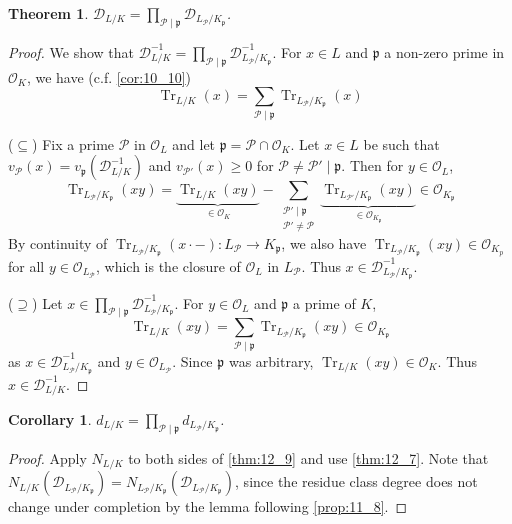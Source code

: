 \documentclass[11pt]{article}
\theoremstyle{definition}
\theoremstyle{plain}
\newtheorem{theorem}[definition]{Theorem}
\newtheorem{corollary}[definition]{Corollary}
\theoremstyle{remark}
\DeclareMathOperator{\Tr}{Tr}
\newcommand{\cD}{\mathcal{D}}
\newcommand{\cO}{\mathcal{O}}
\newcommand{\cP}{\mathcal{P}}
\newcommand{\fp}{\mathfrak{p}}
\begin{document}
\begin{theorem}\label{thm:12_9}
    $\cD_{L/K} = \prod_{\cP \mid \fp} \cD_{L_\cP / K_\fp}$.
\end{theorem}
\begin{proof}
    We show that $\cD_{L/K}^{-1} = \prod_{\cP \mid \fp} \cD_{L_\cP / K_\fp}^{-1}$. For $x \in L$ and $\fp$ a non-zero prime in $\cO_K$, we have (c.f. \autoref{cor:10_10})
    \begin{equation}\label{eq:3}
        \Tr_{L/K}(x) = \sum_{\cP \mid \fp} \Tr_{L_\cP / K_\fp}(x)
    \end{equation}

    \noindent ($\subseteq$) Fix a prime $\cP$ in $\cO_L$ and let $\fp = \cP \cap \cO_K$. Let $x \in L$ be such that $v_\cP(x) = v_\fp(\cD_{L/K}^{-1})$ and $v_{\cP'}(x) \ge 0$ for $\cP \neq \cP' \mid \fp$. Then for $y \in \cO_L$,
    \begin{equation*}
        \Tr_{L_\cP/K_\fp}(xy) = \underbrace{\Tr_{L/K}(xy)}_{\in \cO_K} - \sum_{\substack{\cP' \mid \fp \\ \cP' \neq \cP}} \underbrace{\Tr_{L_{\cP'}/K_\fp}(xy)}_{\in \cO_{K_\fp}} \in \cO_{K_\fp}
    \end{equation*}
    By continuity of $\Tr_{L_\cP / K_\fp}(x \cdot -) : L_\cP \to K_\fp$, we also have $\Tr_{L_\cP / K_\fp}(xy) \in \cO_{K_p}$ for all $y \in \cO_{L_\cP}$, which is the closure of $\cO_L$ in $L_\cP$. Thus $x \in \cD_{L_\cP / K_\fp}^{-1}$.

    \noindent ($\supseteq$) Let $x \in \prod_{\cP \mid \fp} \cD_{L_\cP / K_\fp}^{-1}$. For $y \in \cO_L$ and $\fp$ a prime of $K$,
    \begin{equation*}
        \Tr_{L/K}(xy) = \sum_{\cP \mid \fp} \Tr_{L_\cP / K_\fp}(xy) \in \cO_{K_\fp}
    \end{equation*}
    as $x \in \cD_{L_\cP / K_\fp}^{-1}$ and $y \in \cO_{L_\cP}$. Since $\fp$ was arbitrary, $\Tr_{L/K}(xy) \in \cO_K$. Thus $x \in \cD_{L/K}^{-1}$.
\end{proof}

\begin{corollary}\label{cor:12_10}
    $d_{L/K} = \prod_{\cP \mid \fp} d_{L_\cP / K_\fp}$.
\end{corollary}
\begin{proof}
    Apply $N_{L/K}$ to both sides of \autoref{thm:12_9} and use \autoref{thm:12_7}. Note that $N_{L/K}(\cD_{L_\cP / K_\fp}) = N_{L_\cP / K_\fp}(\cD_{L_\cP / K_\fp})$, since the residue class degree does not change under completion by the lemma following \autoref{prop:11_8}.
\end{proof}
\end{document}
